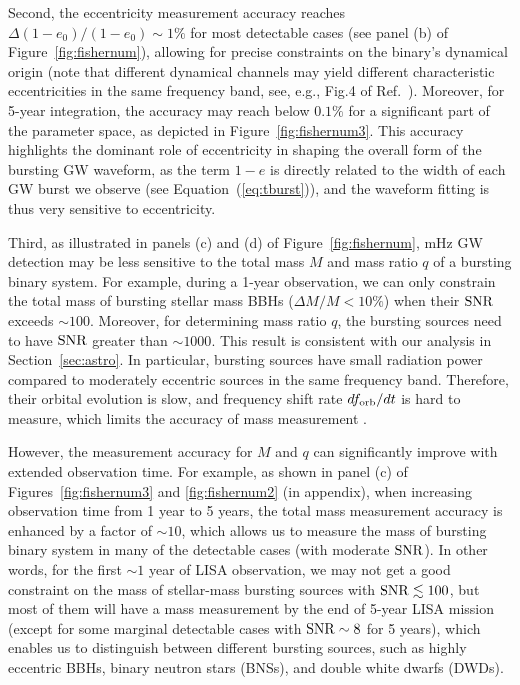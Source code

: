 \documentclass[%
 reprint,
 amsmath,amssymb,
 aps,
]{revtex4-2}
\newcommand{\xzy}[1]{\textcolor{red}{{\bf} #1}}
\begin{document}
Second, the eccentricity measurement accuracy reaches $\Delta(1-e_0)/(1-e_0)\sim 1\%$ for most detectable cases (see panel (b) of Figure~\ref{fig:fishernum}), allowing for precise constraints on the binary's dynamical origin (note that different dynamical channels may yield different characteristic eccentricities in the same frequency band, see, e.g., Fig.4 of Ref.~\citep{Martinez+20}).  Moreover, for 5-year integration, the accuracy may reach below $0.1\%$ for a significant part of the parameter space, as depicted in Figure~\ref{fig:fishernum3}. This accuracy highlights the dominant role of eccentricity in shaping the overall form of the bursting GW waveform, as the term $1-e$ is directly related to the width of each GW burst we observe (see Equation~(\ref{eq:tburst})), and the waveform fitting is thus very sensitive to eccentricity.

Third, as illustrated in panels (c) and (d) of Figure~\ref{fig:fishernum}, mHz GW detection may be less sensitive to the total mass $M$ and mass ratio $q$ of a bursting binary system. For example, during a 1-year observation, we can only constrain the total mass of bursting stellar mass BBHs ($\Delta M/M<10\%$) when their $\rm SNR$ exceeds $\sim 100$. Moreover, for determining mass ratio $q$, the bursting sources need to have $\rm SNR$ greater than $\sim 1000$. This result is consistent with our analysis in Section~\ref{sec:astro}. In particular, bursting sources have small radiation power compared to moderately eccentric sources in the same frequency band. Therefore, their orbital evolution is slow, and frequency shift rate $df_{\rm orb}/dt$ is hard to measure, which limits the accuracy of mass measurement \citep[see, e.g.,][]{Cutler+94}.

However, the measurement accuracy for $M$ and $q$ can significantly improve with extended observation time. For example, as shown in panel (c) of Figures~\ref{fig:fishernum3} and \ref{fig:fishernum2} (in appendix), when increasing observation time from 1 year to 5 years, the total mass measurement accuracy is enhanced by a factor of $\sim 10$, which allows us to measure the mass of bursting binary system in many of the detectable cases (with moderate $\rm SNR$). In other words, for the first $\sim 1$ year of LISA observation, we may not get a good constraint on the mass of stellar-mass bursting sources with $\rm SNR \lesssim 100$, but most of them will have a mass measurement by the end of 5-year LISA mission (except for some marginal detectable cases with $\rm SNR\sim 8$ for 5 years), which enables us to distinguish between different bursting sources, such as highly eccentric BBHs, binary neutron stars (BNSs), and double white dwarfs (DWDs). 
\end{document}
